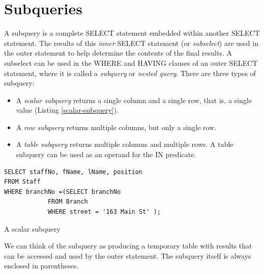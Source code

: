 \documentclass[12pt,a4paper]{article}
\begin{document}
\section{Subqueries}
A subquery is a complete SELECT statement embedded within another SELECT statement. The results of this \emph{inner} SELECT statement  (or \emph{subselect}) are used in the outer statement to help determine the contents of the final results. A subselect can be used in the WHERE and HAVING clauses of an outer SELECT statement, where it is called a \emph{subquery} or \emph{nested query}. There are three types of subquery:
\begin{itemize}
\item A \emph{scalar subquery} returns a single column and a single row, that is, a single value (Listing \ref{scalar-subquery}).
\item A \emph{row subquery} returns multiple columns, but only a single row.
\item A \emph{table subquery} returns multiple columns and multiple rows. A table subquery can be used as an operand for the IN predicate.
\end{itemize}
\begin{listing}
\begin{verbatim}
SELECT staffNo, fName, lName, position
FROM Staff
WHERE branchNo =(SELECT branchNo
     		FROM Branch
     		WHERE street = '163 Main St' );
\end{verbatim}
\caption{A scalar subquery}\label{scalar-subquery}
\end{listing}
We can think of the subquery as producing a temporary table with results that can be accessed and used by the outer statement. The subquery itself is always enclosed in parentheses.
\end{document}
